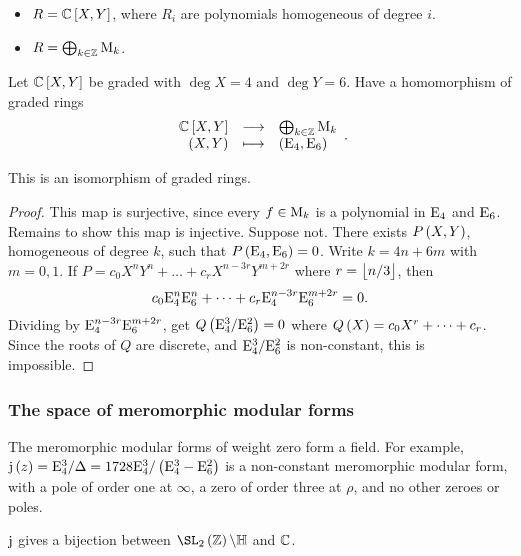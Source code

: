 \begin{example*}
\hfill
\begin{itemize}
\item $ R = \CC\sbr{X, Y} $, where $ R_i $ are polynomials homogeneous of degree $ i $.
\item $ R = \bigoplus_{k \in \mathbb{Z}} \mathrm{M}_k $.
\end{itemize}
\end{example*}

\pagebreak

Let $ \CC\sbr{X, Y} $ be graded with $ \deg X = 4 $ and $ \deg Y = 6 $. Have a homomorphism of graded rings
$$ \function{\CC\sbr{X, Y}}{\bigoplus_{k \in \ZZ} \M_k}{\br{X, Y}}{\br{\E_4, \E_6}}. $$

\begin{theorem}
This is an isomorphism of graded rings.
\end{theorem}

\begin{proof}
This map is surjective, since every $ f \in \mathrm{M}_k $ is a polynomial in $ \mathrm{E}_4 $ and $ \mathrm{E}_6 $. Remains to show this map is injective. Suppose not. There exists $ P\br{X, Y} $, homogeneous of degree $ k $, such that $ P\br{\E_4, \E_6} = 0 $. Write $ k = 4n + 6m $ with $ m = 0, 1 $. If $ P = c_0X^nY^n + \dots + c_rX^{n - 3r}Y^{m + 2r} $ where $ r = \left\lfloor n / 3 \right\rfloor $, then
$$ c_0\mathrm{E}_4^n\mathrm{E}_6^n + \dots + c_r\mathrm{E}_4^{n - 3r}\mathrm{E}_6^{m + 2r} = 0. $$
Dividing by $ \mathrm{E}_4^{n - 3r}\mathrm{E}_6^{m + 2r} $, get $ Q\br{\E_4^3 / \E_6^2} = 0 $ where $ Q\br{X} = c_0X^r + \dots + c_r $. Since the roots of $ Q $ are discrete, and $ \mathrm{E}_4^3 / \mathrm{E}_6^2 $ is non-constant, this is impossible.
\end{proof}

\subsubsection{The space of meromorphic modular forms}

\begin{note*}
The meromorphic modular forms of weight zero form a field. For example, $ \j\br{z} = \E_4^3 / \Delta = 1728\E_4^3 / \br{\E_4^3 - \E_6^2} $ is a non-constant meromorphic modular form, with a pole of order one at $ \infty $, a zero of order three at $ \rho $, and no other zeroes or poles.
\end{note*}

\begin{theorem}
$ \mathrm{j} $ gives a bijection between $ \SL_2\br{\ZZ} \backslash \HH $ and $ \mathbb{C} $.
\end{theorem}

